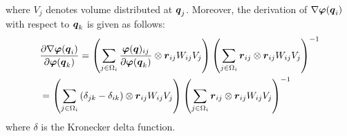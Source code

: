 where $V_j$ denotes volume distributed at $\boldsymbol{q}_j$. 
Moreover, the derivation of $\nabla\boldsymbol{\varphi}(\boldsymbol{q}_i)$ with respect to $\boldsymbol{q}_k$ is given as follows:
\begin{eqnarray}
\begin{split}
&\frac{\partial\nabla\boldsymbol{\varphi}(\boldsymbol{q}_i)}{\partial \boldsymbol{\varphi}(\boldsymbol{q}_k)}=\left(\sum_{j\in\Omega_i}\frac{\boldsymbol{\varphi}(\boldsymbol{q})_{ij}}{\partial\boldsymbol{\varphi}(\boldsymbol{q}_{k})}\otimes \boldsymbol{r}_{ij} W_{ij} V_j\right)\left(\sum_{j\in\Omega_i}\boldsymbol{r}_{ij}\otimes\boldsymbol{r}_{ij} W_{ij} V_j \right)^{-1} \\
&=\left(\sum_{j\in\Omega_i}\left(\delta_{jk}-\delta_{ik}\right)\otimes \boldsymbol{r}_{ij} W_{ij} V_j\right)\left(\sum_{j\in\Omega_i}\boldsymbol{r}_{ij}\otimes\boldsymbol{r}_{ij} W_{ij} V_j \right)^{-1}\\
\end{split}
\label{eq:dFdq}
\end{eqnarray}
where $\delta$ is the Kronecker delta function.


